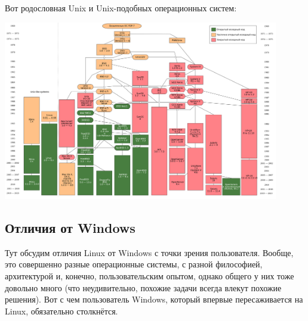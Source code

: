 \documentclass{../../text-style}
\begin{document}
Вот родословная Unix и Unix-подобных операционных систем:

\begin{center}
    \includegraphics[width=0.9\textwidth]{unixHistory.png}
\end{center}

\subsection{Отличия от Windows}

Тут обсудим отличия Linux от Windows с точки зрения пользователя.
Вообще, это совершенно разные операционные системы, с разной философией, архитектурой и, конечно, пользовательским опытом, однако общего у них тоже довольно много (что неудивительно, похожие задачи всегда влекут похожие решения).
Вот с чем пользователь Windows, который впервые пересаживается на Linux, обязательно столкнётся.
\end{document}
